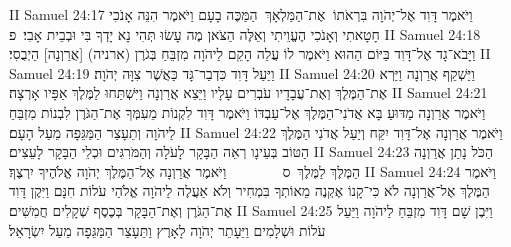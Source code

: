 II Samuel 24:17	וַיֹּאמֶר דָּוִד אֶל־יְהֹוָה בִּרְאֹתוֹ  אֶת־הַמַּלְאָךְ  הַמַּכֶּה בָעָם וַיֹּאמֶר הִנֵּה אָנֹכִי חָטָאתִי וְאָנֹכִי הֶעֱוֵיתִי וְאֵלֶּה הַצֹּאן מֶה עָשׂוּ תְּהִי נָא יָדְךָ בִּי וּבְבֵית אָבִי׃ {פ}
II Samuel 24:18	וַיָּבֹא־גָד אֶל־דָּוִד בַּיּוֹם הַהוּא וַיֹּאמֶר לוֹ עֲלֵה הָקֵם לַיהֹוָה מִזְבֵּחַ בְּגֹרֶן (ארניה) [אֲרַוְנָה] הַיְבֻסִי׃
II Samuel 24:19	וַיַּעַל דָּוִד כִּדְבַר־גָּד כַּאֲשֶׁר צִוָּה יְהֹוָה׃
II Samuel 24:20	וַיַּשְׁקֵף אֲרַוְנָה וַיַּרְא אֶת־הַמֶּלֶךְ וְאֶת־עֲבָדָיו עֹבְרִים עָלָיו וַיֵּצֵא אֲרַוְנָה וַיִּשְׁתַּחוּ לַמֶּלֶךְ אַפָּיו אָרְצָה׃
II Samuel 24:21	וַיֹּאמֶר אֲרַוְנָה מַדּוּעַ בָּא אֲדֹנִי־הַמֶּלֶךְ אֶל־עַבְדּוֹ וַיֹּאמֶר דָּוִד לִקְנוֹת מֵעִמְּךָ אֶת־הַגֹּרֶן לִבְנוֹת מִזְבֵּחַ לַיהֹוָה וְתֵעָצַר הַמַּגֵּפָה מֵעַל הָעָם׃
II Samuel 24:22	וַיֹּאמֶר אֲרַוְנָה אֶל־דָּוִד יִקַּח וְיַעַל אֲדֹנִי הַמֶּלֶךְ הַטּוֹב בְּעֵינָו רְאֵה הַבָּקָר לָעֹלָה וְהַמֹּרִגִּים וּכְלֵי הַבָּקָר לָעֵצִים׃
II Samuel 24:23	הַכֹּל נָתַן אֲרַוְנָה הַמֶּלֶךְ לַמֶּלֶךְ {ס}        וַיֹּאמֶר אֲרַוְנָה אֶל־הַמֶּלֶךְ יְהֹוָה אֱלֹהֶיךָ יִרְצֶךָ׃
II Samuel 24:24	וַיֹּאמֶר הַמֶּלֶךְ אֶל־אֲרַוְנָה לֹא כִּי־קָנוֹ אֶקְנֶה מֵאוֹתְךָ בִּמְחִיר וְלֹא אַעֲלֶה לַיהֹוָה אֱלֹהַי עֹלוֹת חִנָּם וַיִּקֶן דָּוִד אֶת־הַגֹּרֶן וְאֶת־הַבָּקָר בְּכֶסֶף שְׁקָלִים חֲמִשִּׁים׃
II Samuel 24:25	וַיִּבֶן שָׁם דָּוִד מִזְבֵּחַ לַיהֹוָה וַיַּעַל עֹלוֹת וּשְׁלָמִים וַיֵּעָתֵר יְהֹוָה לָאָרֶץ וַתֵּעָצַר הַמַּגֵּפָה מֵעַל יִשְׂרָאֵל׃
